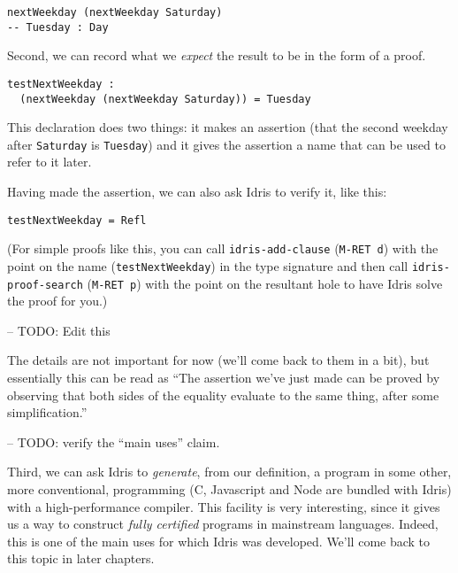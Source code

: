\documentclass[b5paper,twoside]{amsbook}
\begin{document}
\begin{verbatim}
nextWeekday (nextWeekday Saturday)
-- Tuesday : Day
\end{verbatim}

Second, we can record what we \emph{expect} the result to be in the form
of a proof.

\begin{verbatim}
testNextWeekday :
  (nextWeekday (nextWeekday Saturday)) = Tuesday
\end{verbatim}

This declaration does two things: it makes an assertion (that the second
weekday after \texttt{Saturday} is
\texttt{Tuesday}) and it gives the assertion a name that
can be used to refer to it later.

Having made the assertion, we can also ask Idris to verify it, like
this:

\begin{verbatim}
testNextWeekday = Refl
\end{verbatim}

(For simple proofs like this, you can call
\texttt{idris-add-clause} (\texttt{M-RET d})
with the point on the name (\texttt{testNextWeekday}) in
the type signature and then call
\texttt{idris-proof-search} (\texttt{M-RET p})
with the point on the resultant hole to have Idris solve the proof for
you.)

-- TODO: Edit this

The details are not important for now (we'll come back to them in a
bit), but essentially this can be read as ``The assertion we've just
made can be proved by observing that both sides of the equality evaluate
to the same thing, after some simplification.''

-- TODO: verify the ``main uses'' claim.

Third, we can ask Idris to \emph{generate}, from our definition, a
program in some other, more conventional, programming (C, Javascript and
Node are bundled with Idris) with a high-performance compiler. This
facility is very interesting, since it gives us a way to construct
\emph{fully certified} programs in mainstream languages. Indeed, this is
one of the main uses for which Idris was developed. We'll come back to
this topic in later chapters.
\end{document}
